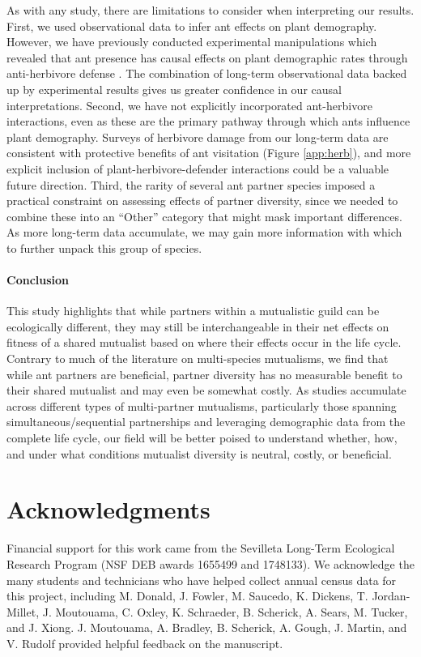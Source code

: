 \documentclass[11pt]{article}
\begin{document}
As with any study, there are limitations to consider when interpreting our results.
First, we used observational data to infer ant effects on plant demography. 
However, we have previously conducted experimental manipulations which revealed that ant presence has causal effects on plant demographic rates through anti-herbivore defense \citep{Miller2007,Ohm2014}.
The combination of long-term observational data backed up by experimental results gives us greater confidence in our causal interpretations. 
Second, we have not explicitly incorporated ant-herbivore interactions, even as these are the primary pathway through which ants influence plant demography. 
Surveys of herbivore damage from our long-term data are consistent with protective benefits of ant visitation (Figure \ref{app:herb}), and more explicit inclusion of plant-herbivore-defender interactions could be a valuable future direction. 
Third, the rarity of several ant partner species imposed a practical constraint on assessing effects of partner diversity, since we needed to combine these into an ``Other'' category that might mask important differences. 
As more long-term data accumulate, we may gain more information with which to further unpack this group of species. 

\paragraph{Conclusion}
This study highlights that while partners within a mutualistic guild can be ecologically different, they may still be interchangeable in their net effects on fitness of a shared mutualist based on where their effects occur in the life cycle. 
Contrary to much of the literature on multi-species mutualisms, we find that while ant partners are beneficial, partner diversity has no measurable benefit to their shared mutualist and may even be somewhat costly. 
As studies accumulate across different types of multi-partner mutualisms, particularly those spanning simultaneous/sequential partnerships and leveraging demographic data from the complete life cycle, our field will be better poised to understand whether, how, and under what conditions mutualist diversity is neutral, costly, or beneficial.


\section*{Acknowledgments}
Financial support for this work came from the Sevilleta Long-Term Ecological Research Program (NSF DEB awards 1655499 and 1748133).
We acknowledge the many students and technicians who have helped collect annual census data for this project, including M. Donald, J. Fowler, M. Saucedo, K. Dickens, T. Jordan-Millet, J. Moutouama, C. Oxley, K. Schraeder, B. Scherick, A. Sears, M. Tucker, and J. Xiong. 
J. Moutouama, A. Bradley, B. Scherick, A. Gough, J. Martin, and V. Rudolf provided helpful feedback on the manuscript. 
\end{document}
